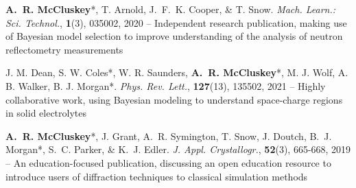 \begin{cventriesy}
  \cventryy
    {
      \begin{cvitemsy}
        \item {\textbf{A.~R. McCluskey}*, T. Arnold, J.~F.~K. Cooper, \& T. Snow. \emph{Mach. Learn.: Sci. Technol.}, \textbf{1}(3), 035002, 2020 -- Independent research publication, making use of Bayesian model selection to improve understanding of the analysis of neutron reflectometry measurements}
    \vspace{1mm}
        \item {J. M. Dean, S. W. Coles*, W. R. Saunders, \textbf{A.~R. McCluskey}*, M. J. Wolf, A. B. Walker, B. J. Morgan*. \emph{Phys. Rev. Lett.}, \textbf{127}(13), 135502, 2021 -- Highly collaborative work, using Bayesian modeling to understand space-charge regions in solid electrolytes}
    \vspace{1mm}
        \item {\textbf{A.~R. McCluskey}*, J. Grant, A.~R. Symington, T. Snow, J. Doutch, B.~J. Morgan*, S.~C. Parker, \& K.~J. Edler. \emph{J. Appl. Crystallogr.}, \textbf{52}(3), 665-668, 2019 -- An education-focused publication, discussing an open education resource to introduce users of diffraction techniques to classical simulation methods} 
      \end{cvitemsy}
    }
\end{cventriesy}
